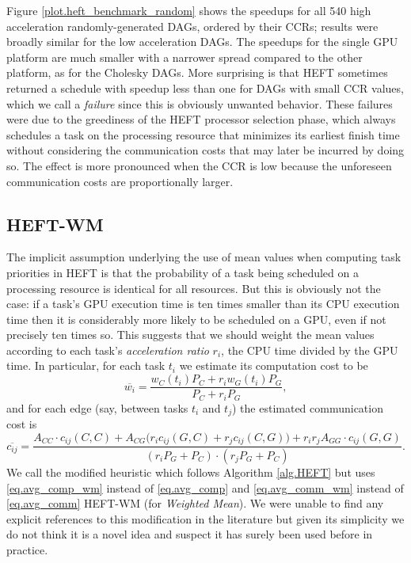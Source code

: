 \documentclass[runningheads]{llncs}
\begin{document}
Figure \ref{plot.heft_benchmark_random} shows the speedups for all 540 high acceleration randomly-generated DAGs, ordered by their CCRs; results were broadly similar for the low acceleration DAGs. The speedups for the single GPU platform are much smaller with a narrower spread compared to the other platform, as for the Cholesky DAGs. More surprising is that HEFT sometimes returned a schedule with speedup less than one for DAGs with small CCR values, which we call a {\em failure} since this is obviously unwanted behavior. These failures were due to the greediness of the HEFT processor selection phase, which always schedules a task on the processing resource that minimizes its earliest finish time without considering the communication costs that may later be incurred by doing so. The effect is more pronounced when the CCR is low because the unforeseen communication costs are proportionally larger. 


\subsection{HEFT-WM}
\label{subsect.heft_WM}

The implicit assumption underlying the use of mean values when computing task priorities in HEFT is that the probability of a task being scheduled on a processing resource is identical for all resources. But this is obviously not the case: if a task's GPU execution time is ten times smaller than its CPU execution time then it is considerably more likely to be scheduled on a GPU, even if not precisely ten times so. This suggests that we should weight the mean values according to each task's {\em acceleration ratio} $r_i$, the CPU time divided by the GPU time. In particular, for each task $t_i$ we estimate its computation cost to be
\begin{equation}
\label{eq.avg_comp_wm}
\overline{w_i} = \frac{w_C(t_i) P_C + r_iw_G(t_i) P_G}{P_C + r_iP_G},
\end{equation}  
and for each edge (say, between tasks $t_i$ and $t_j$) the estimated communication cost is
\begin{equation}
\label{eq.avg_comm_wm}
\overline{c_{ij}} = \frac{A_{CC} \cdot c_{ij}(C, C) + A_{CG}\big(r_ic_{ij}(G, C) + r_jc_{ij}(C, G)\big) + r_ir_j A_{GG} \cdot c_{ij}(G, G) }{(r_iP_G + P_C) \cdot (r_jP_G + P_C)}. 
\end{equation}
We call the modified heuristic which follows Algorithm \ref{alg.HEFT} but uses \eqref{eq.avg_comp_wm} instead of \eqref{eq.avg_comp} and \eqref{eq.avg_comm_wm} instead of \eqref{eq.avg_comm} HEFT-WM (for {\em Weighted Mean}). We were unable to find any explicit references to this modification in the literature but given its simplicity we do not think it is a novel idea and suspect it has surely been used before in practice.    
\end{document}
